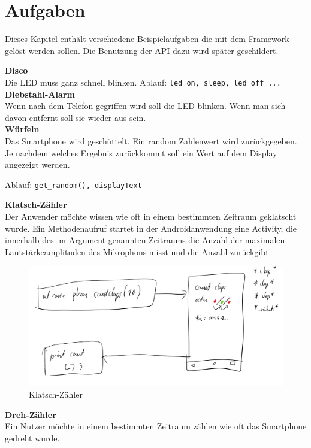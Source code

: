 \documentclass[11pt,a4paper]{report}
\begin{document}
\section*{Aufgaben}
Dieses Kapitel enthält verschiedene Beispielaufgaben die mit dem Framework gelöst werden sollen.
Die Benutzung der API dazu wird später geschildert.


\textbf{Disco}\\
Die LED muss ganz schnell blinken.
Ablauf: \verb|led_on, sleep, led_off ...|
\\

\textbf{Diebstahl-Alarm}\\
Wenn nach dem Telefon gegriffen wird soll die LED blinken.
Wenn man sich davon entfernt soll sie wieder aus sein.
\\

\textbf{Würfeln}\\
Das Smartphone wird geschüttelt.
Ein random Zahlenwert wird zurückgegeben.
Je nachdem welches Ergebnis zurückkommt soll ein Wert auf dem Display angezeigt werden.

Ablauf: \verb|get_random(), displayText|

\textbf{Klatsch-Zähler}\\
Der Anwender möchte wissen wie oft in einem bestimmten Zeitraum geklatscht wurde.
Ein Methodenaufruf startet in der Androidanwendung eine Activity, die innerhalb des im Argument genannten Zeitraums die Anzahl der maximalen Lautstärkeamplituden des Mikrophons misst und die Anzahl zurückgibt.
\begin{figure}[htbp]
  \centering
  \includegraphics[width=.9\textwidth]{images/count_claps.png}
  \caption{Klatsch-Zähler}
  \label{fig:clap_count}
\end{figure}

\textbf{Dreh-Zähler}\\
Ein Nutzer möchte in einem bestimmten Zeitraum zählen wie oft das Smartphone gedreht wurde.
\end{document}
